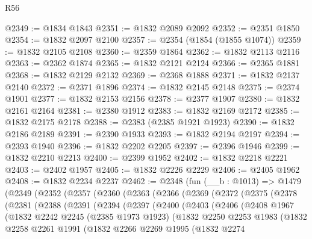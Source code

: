 \begin{lexlean}{R56}
\begin{coremodule}
@2349 := @1834 @1843
@2351 := @1832 @2089 @2092
@2352 := @2351 @1850
@2354 := @1832 @2097 @2100
@2357 := @2354 (@1854 (@1855 @1074))
@2359 := @1832 @2105 @2108
@2360 := @2359 @1864
@2362 := @1832 @2113 @2116
@2363 := @2362 @1874
@2365 := @1832 @2121 @2124
@2366 := @2365 @1881
@2368 := @1832 @2129 @2132
@2369 := @2368 @1888
@2371 := @1832 @2137 @2140
@2372 := @2371 @1896
@2374 := @1832 @2145 @2148
@2375 := @2374 @1901
@2377 := @1832 @2153 @2156
@2378 := @2377 @1907
@2380 := @1832 @2161 @2164
@2381 := @2380 @1912
@2383 := @1832 @2169 @2172
@2385 := @1832 @2175 @2178
@2388 := @2383 (@2385 @1921 @1923)
@2390 := @1832 @2186 @2189
@2391 := @2390 @1933
@2393 := @1832 @2194 @2197
@2394 := @2393 @1940
@2396 := @1832 @2202 @2205
@2397 := @2396 @1946
@2399 := @1832 @2210 @2213
@2400 := @2399 @1952
@2402 := @1832 @2218 @2221
@2403 := @2402 @1957
@2405 := @1832 @2226 @2229
@2406 := @2405 @1962
@2408 := @1832 @2234 @2237
@2462 := @2348
    (fun (__b : @1013) =>
    @1479
      (@2349
        (@2352
          (@2357
            (@2360
              (@2363
                (@2366
                  (@2369
                    (@2372
                      (@2375
                        (@2378
                          (@2381
                            (@2388
                              (@2391
                                (@2394
                                  (@2397
                                    (@2400
                                      (@2403
                                        (@2406
                                          (@2408
                                            @1967
                                            (@1832
                                              @2242
                                              @2245
                                              (@2385 @1973 @1923)
                                              (@1832
                                                @2250
                                                @2253
                                                @1983
                                                (@1832
                                                  @2258
                                                  @2261
                                                  @1991
                                                  (@1832
                                                    @2266
                                                    @2269
                                                    @1995
                                                    (@1832
                                                      @2274

\end{coremodule}
\end{lexlean}
